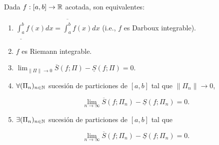	\begin{theorem}
		Dada $f:[a,b]\to\mathbb{R}$ acotada, son equivalentes:

		\begin{enumerate}
			\item $\underline{\int_{a}^{b}} f(x) dx = \overline{\int_{a}^{b}} f(x) dx$ (i.e., $f$ es Darboux integrable).

			\item $f$ es Riemann integrable.

			\item $\lim_{\|\Pi\|\to 0} \overline{S}(f;\Pi)-\underline{S}(f;\Pi)=0$.

			\item $\forall (\Pi_n)_{n\in\mathbb{N}}$ sucesión de particiones de $[a,b]$ tal que $\|\Pi_n\|\to 0$, 

			\[
			\lim_{n \to \infty} \overline{S}(f;\Pi_n)-\underline{S}(f;\Pi_n)=0.
			\]

			\item $\exists (\Pi_n)_{n\in\mathbb{N}}$ sucesión de particiones de $[a,b]$ tal que 

			\[
			\lim_{n \to \infty}\overline{S}(f;\Pi_n)-\underline{S}(f;\Pi_n)=0.
			\]
		\end{enumerate}
	\end{theorem}
